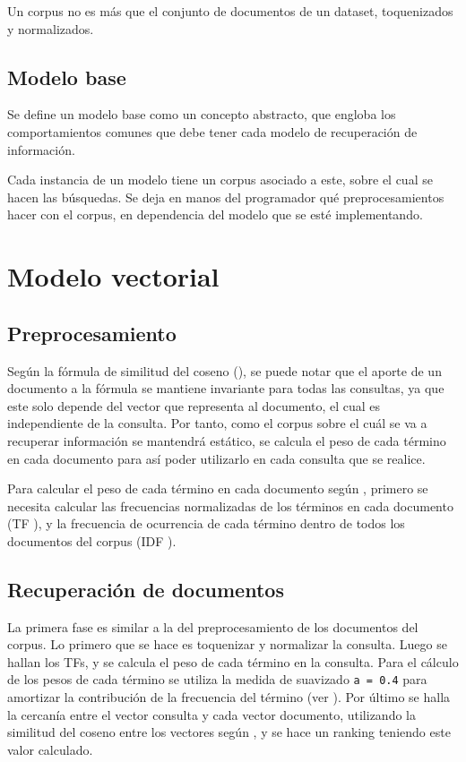 \documentclass{llncs}
\begin{document}
        Un corpus no es más que el conjunto de documentos de un dataset, toquenizados y normalizados.
    
    \subsection{Modelo base}

        Se define un modelo base como un concepto abstracto, que engloba los comportamientos comunes que debe tener cada modelo de recuperaci\'on de informaci\'on. 

        Cada instancia de un modelo tiene un corpus asociado a este, sobre el cual se hacen las b\'usquedas. Se deja en manos del programador qu\'e preprocesamientos hacer con el corpus, en dependencia del modelo que se est\'e implementando. 

\section{Modelo vectorial}

    \subsection{Preprocesamiento}

        Seg\'un la f\'ormula de similitud del coseno (\cite[\emph{Ecuaci\'on}~(6.10)]{B1}), se puede notar que el aporte de un documento a la f\'ormula se mantiene invariante para todas las consultas, ya que este solo depende del vector que representa al documento, el cual es independiente de la consulta. Por tanto, como el corpus sobre el cu\'al se va a recuperar informaci\'on se mantendr\'a est\'atico, se calcula el peso de cada t\'ermino en cada documento para as\'i poder utilizarlo en cada consulta que se realice.

        Para calcular el peso de cada t\'ermino en cada documento seg\'un \cite[Ecuaci\'on (2.3)]{B1}, primero se necesita calcular las frecuencias normalizadas de los t\'erminos en cada documento (TF \cite[Ecuaci\'on (2.1)]{B2}), y la frecuencia de ocurrencia de cada t\'ermino dentro de todos los documentos del corpus (IDF \cite[Ecuaci\'on(2.2)]{B2}).

    \subsection{Recuperación de documentos}

        La primera fase es similar a la del preprocesamiento de los documentos del corpus. Lo primero que se hace es toquenizar y normalizar la consulta. Luego se hallan los TFs, y se calcula el peso de cada t\'ermino en la consulta. Para el c\'alculo de los pesos de cada t\'ermino  se utiliza la medida de suavizado \texttt{a = 0.4} para amortizar la contribuci\'on de la frecuencia del t\'ermino (ver \cite[ecuaci\'on (2.4)]{B2}). Por \'ultimo se halla la cercan\'ia entre el vector consulta y cada vector documento, utilizando la similitud del coseno entre los vectores seg\'un \cite[Ecuaci\'on 6.10]{B1}, y se hace un ranking teniendo este valor calculado.
\end{document}
